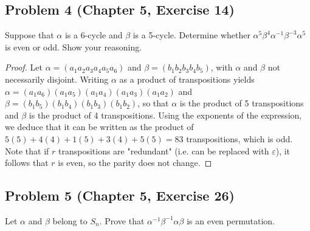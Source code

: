 \documentclass{article}
\begin{document}
\subsection*{Problem 4 (Chapter 5, Exercise 14)}
Suppose that $\alpha$ is a 6-cycle and $\beta$ is a 5-cycle. Determine whether $\alpha^5\beta^4\alpha^{-1}\beta^{-3}\alpha^5$ is even or odd. Show your reasoning.

\begin{proof}

Let $\alpha = (a_1a_2a_3a_4a_5a_6)$ and $\beta = (b_1b_2b_3b_4b_5)$, with $\alpha$ and $\beta$ not necessarily disjoint. Writing $\alpha$ as a product of transpositions yields \\ $\alpha = (a_1a_6)(a_1a_5)(a_1a_4)(a_1a_3)(a_1a_2)$ and $\beta = (b_1b_5)(b_1b_4)(b_1b_3)(b_1b_2)$, so that $\alpha$ is the product of 5 transpositions and $\beta$ is the product of 4 transpositions. Using the exponents of the expression, we deduce that it can be written as the product of $5(5) + 4(4) + 1(5) + 3(4) + 5(5) = 83$ transpositions, which is odd. Note that if $r$ transpositions are "redundant" (i.e. can be replaced with $\varepsilon$), it follows that $r$ is even, so the parity does not change.

\end{proof}


\subsection*{Problem 5 (Chapter 5, Exercise 26)}

Let $\alpha$ and $\beta$ belong to $S_n$. Prove that $\alpha^{-1}\beta^{-1}\alpha\beta$ is an even permutation.
\end{document}
